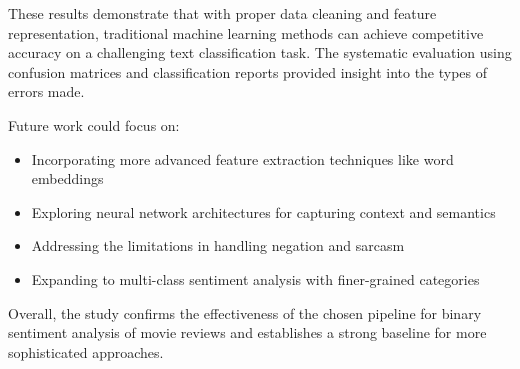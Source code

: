 \documentclass{article}
\begin{document}
These results demonstrate that with proper data cleaning and feature representation, traditional machine learning methods can achieve competitive accuracy on a challenging text classification task. The systematic evaluation using confusion matrices and classification reports provided insight into the types of errors made.

Future work could focus on:
\begin{itemize}
\item Incorporating more advanced feature extraction techniques like word embeddings
\item Exploring neural network architectures for capturing context and semantics
\item Addressing the limitations in handling negation and sarcasm
\item Expanding to multi-class sentiment analysis with finer-grained categories
\end{itemize}

Overall, the study confirms the effectiveness of the chosen pipeline for binary sentiment analysis of movie reviews and establishes a strong baseline for more sophisticated approaches.
\end{document}
